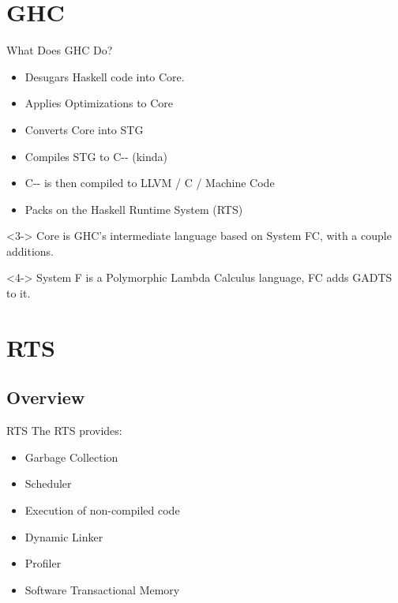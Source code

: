 
\section{GHC}
\begin{frame}[t]{What Does GHC Do?}
    \begin{itemize}
        \item<2-> Desugars Haskell code into Core.
        \item<5-> Applies Optimizations to Core
        \item<6-> Converts Core into STG
        \item<7-> Compiles STG to C-{}- (kinda)
        \item<8-> C-{}- is then compiled to LLVM / C / Machine Code
        \item<9-> Packs on the Haskell Runtime System (RTS)
    \end{itemize}

    \begin{definition}<3->
        \alert{Core} is GHC's intermediate language based on System FC, with a couple additions.
    \end{definition}

    \begin{definition}<4->
        \alert{System F} is a Polymorphic Lambda Calculus language, \alert{FC} adds GADTS to it.
    \end{definition}
\end{frame}

\section{RTS}
\subsection{Overview}
\begin{frame}[t]{RTS}
    The RTS provides:
    \begin{itemize}[<+->]
        \item Garbage Collection
        \item Scheduler
        \item Execution of non-compiled code
        \item Dynamic Linker
        \item Profiler
        \item Software Transactional Memory
    \end{itemize}
\end{frame}

